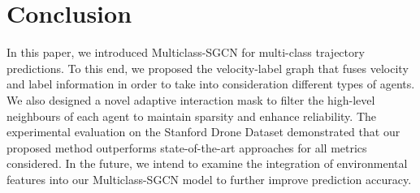 \documentclass{article}
\begin{document}
\section{Conclusion}
\label{sec:conlusion}
In this paper, we introduced Multiclass-SGCN for multi-class trajectory predictions. To this end, we proposed the velocity-label graph that fuses velocity and label information in order to take into consideration different types of agents. We also designed a novel adaptive interaction mask to filter the high-level neighbours of each agent to maintain sparsity and enhance reliability. The experimental evaluation on the Stanford Drone Dataset demonstrated that our proposed method outperforms state-of-the-art approaches for all metrics considered. In the future, we intend to examine the integration of environmental features \cite{mangalam2021ynet} into our Multiclass-SGCN model to further improve prediction accuracy.



\end{document}
